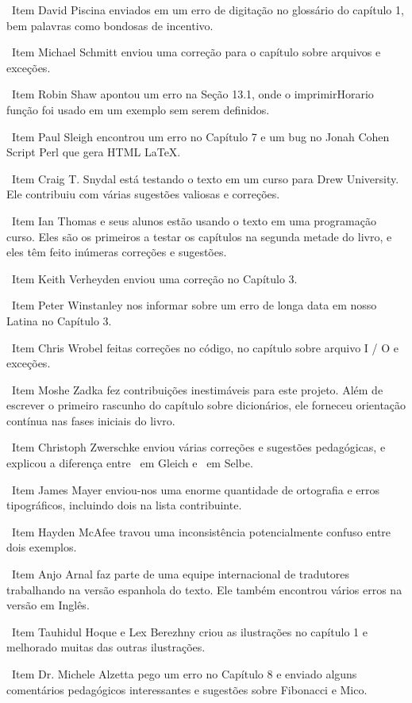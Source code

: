 \documentclass[10pt]{book}
\begin{document}
\ Item David Piscina enviados em um erro de digitação no glossário do capítulo 1, bem
palavras como bondosas de incentivo.

\ Item Michael Schmitt enviou uma correção para o capítulo sobre arquivos
e exceções.

\ Item Robin Shaw apontou um erro na Seção 13.1, onde o
imprimirHorario função foi usado em um exemplo sem serem definidos.

\ Item Paul Sleigh encontrou um erro no Capítulo 7 e um bug no Jonah Cohen
Script Perl que gera HTML LaTeX.

\ Item Craig T. Snydal está testando o texto em um curso para Drew
University. Ele contribuiu com várias sugestões valiosas e correções.

\ Item Ian Thomas e seus alunos estão usando o texto em uma programação
curso. Eles são os primeiros a testar os capítulos na segunda metade
do livro, e eles têm feito inúmeras correções e sugestões.

\ Item Keith Verheyden enviou uma correção no Capítulo 3.

\ Item Peter Winstanley nos informar sobre um erro de longa data em
nosso Latina no Capítulo 3.

\ Item Chris Wrobel feitas correções no código, no capítulo sobre
arquivo I / O e exceções. 

\ Item Moshe Zadka fez contribuições inestimáveis ​​para este projeto.
Além de escrever o primeiro rascunho do capítulo sobre dicionários, ele
forneceu orientação contínua nas fases iniciais do livro.

\ Item Christoph Zwerschke enviou várias correções e
sugestões pedagógicas, e explicou a diferença entre {\ em Gleich}
e {\ em Selbe}.

\ Item James Mayer enviou-nos uma enorme quantidade de ortografia e
erros tipográficos, incluindo dois na lista contribuinte.

\ Item Hayden McAfee travou uma inconsistência potencialmente confuso
entre dois exemplos.

\ Item Anjo Arnal faz parte de uma equipe internacional de tradutores
trabalhando na versão espanhola do texto. Ele também encontrou vários
erros na versão em Inglês.

\ Item Tauhidul Hoque e Lex Berezhny criou as ilustrações
no capítulo 1 e melhorado muitas das outras ilustrações.

\ Item Dr. Michele Alzetta pego um erro no Capítulo 8 e enviado
alguns comentários pedagógicos interessantes e sugestões sobre Fibonacci
e Mico.
\end{document}
